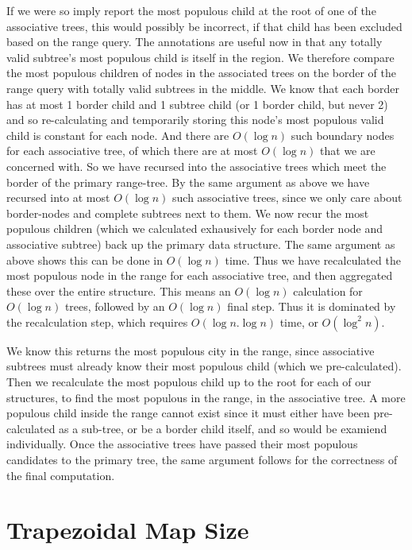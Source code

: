 \documentclass{article}
\begin{document}
If we were so imply report the most populous child at the root of one of the associative trees, this would possibly be incorrect, if that child has been excluded based on the range query.
The annotations are useful now in that any totally valid subtree's most populous child is itself in the region.
We therefore compare the most populous children of nodes in the associated trees on the border of the range query with totally valid subtrees in the middle.
We know that each border has at most 1 border child and 1 subtree child (or 1 border child, but never 2) and so re-calculating and temporarily storing this node's most populous valid child is constant for each node.
And there are $O(\log n)$ such boundary nodes for each associative tree, of which there are at most $O(\log n)$ that we are concerned with.
So we have recursed into the associative trees which meet the border of the primary range-tree.
By the same argument as above we have recursed into at most $O(\log n)$ such associative trees, since we only care about border-nodes and complete subtrees next to them.
We now recur the most populous children (which we calculated exhausively for each border node and associative subtree) back up the primary data structure.
The same argument as above shows this can be done in $O(\log n)$ time.
Thus we have recalculated the most populous node in the range for each associative tree, and then aggregated these over the entire structure.
This means an $O(\log n)$ calculation for $O(\log n)$ trees, followed by an $O(\log n)$ final step.
Thus it is dominated by the recalculation step, which requires $O(\log n . \log n)$ time, or $O(\log^2 n)$.

We know this returns the most populous city in the range, since associative subtrees must already know their most populous child (which we pre-calculated).
Then we recalculate the most populous child up to the root for each of our structures, to find the most populous in the range, in the associative tree.
A more populous child inside the range cannot exist since it must either have been pre-calculated as a sub-tree, or be a border child itself, and so would be examiend individually.
Once the associative trees have passed their most populous candidates to the primary tree, the same argument follows for the correctness of the final computation.

\section {Trapezoidal Map Size}
\end{document}
